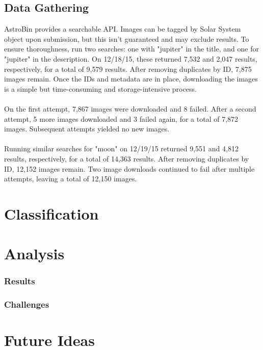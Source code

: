 \documentclass[]{article}
\begin{document}
\subsection*{Data Gathering}
AstroBin provides a searchable API. Images can be tagged by Solar System object upon submission, but this isn't guaranteed and may exclude results. To ensure thoroughness, run two searches: one with "jupiter" in the title, and one for "jupiter" in the description. On 12/18/15, these returned 7,532 and 2,047 results, respectively, for a total of 9,579 results. After removing duplicates by ID, 7,875 images remain. Once the IDs and metadata are in place, downloading the images is a simple but time-consuming and storage-intensive process.
\\\\
On the first attempt, 7,867 images were downloaded and 8 failed. After a second attempt, 5 more images downloaded and 3 failed again, for a total of 7,872 images. Subsequent attempts yielded no new images.
\\\\
Running similar searches for "moon" on 12/19/15 returned 9,551 and 4,812 results, respectively, for a total of 14,363 results. After removing duplicates by ID, 12,152 images remain. Two image downloads continued to fail after multiple attempts, leaving a total of 12,150 images.
\section*{Classification}
\section*{Analysis}
\subsubsection*{Results}
\subsubsection*{Challenges}
\section*{Future Ideas}
\end{document}
